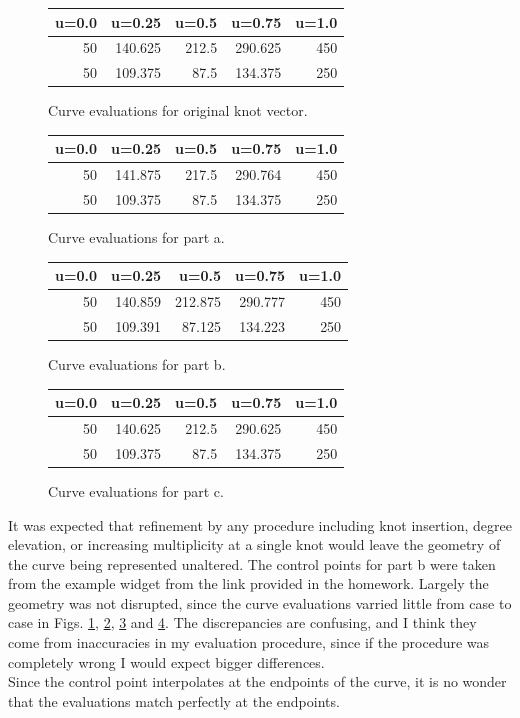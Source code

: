 \documentclass[11pt,letterpaper]{article}
\begin{document}
\begin{figure}[!tbh]
\centering
\begin{tabular}{rrrrr}
\hline
   u=0.0 &   u=0.25 &   u=0.5 &   u=0.75 &   u=1.0 \\
\hline
      50 &  140.625 &   212.5 &  290.625 &     450 \\
      50 &  109.375 &    87.5 &  134.375 &     250 \\
\hline
\end{tabular}
\caption{Curve evaluations for original knot vector.}
\label{tab5}
\end{figure}

\begin{figure}[!tbh]
\centering
\begin{tabular}{rrrrr}
\hline
   u=0.0 &   u=0.25 &   u=0.5 &   u=0.75 &   u=1.0 \\
\hline
      50 &  141.875 &   217.5 &  290.764 &     450 \\
      50 &  109.375 &    87.5 &  134.375 &     250 \\
\hline
\end{tabular}
\caption{Curve evaluations for part a.}
\label{tab6}
\end{figure}

\begin{figure}[!tbh]
\centering
\begin{tabular}{rrrrr}
\hline
   u=0.0 &   u=0.25 &   u=0.5 &   u=0.75 &   u=1.0 \\
\hline
      50 &  140.859 & 212.875 &  290.777 &     450 \\
      50 &  109.391 &  87.125 &  134.223 &     250 \\
\hline
\end{tabular}
\caption{Curve evaluations for part b.}
\label{tab7}
\end{figure}

\begin{figure}[!tbh]
\centering
\begin{tabular}{rrrrr}
\hline
   u=0.0 &   u=0.25 &   u=0.5 &   u=0.75 &   u=1.0 \\
\hline
      50 &  140.625 &   212.5 &  290.625 &     450 \\
      50 &  109.375 &    87.5 &  134.375 &     250 \\
\hline
\end{tabular}
\caption{Curve evaluations for part c.}
\label{tab8}
\end{figure}

It was expected that refinement by any procedure including knot insertion, degree elevation, or increasing multiplicity at a single knot would leave the geometry of the curve being represented unaltered.
The control points for part b were taken from the example widget from the link provided in the homework. Largely the geometry was not disrupted, since the curve evaluations varried little from case to case in Figs. \ref{tab5}, \ref{tab6}, \ref{tab7} and \ref{tab8}.
The discrepancies are confusing, and I think they come from inaccuracies in my evaluation procedure, since if the procedure was completely wrong I would expect bigger differences. \\

Since the control point interpolates at the endpoints of the curve, it is no wonder that the evaluations match perfectly at the endpoints.
\end{document}
